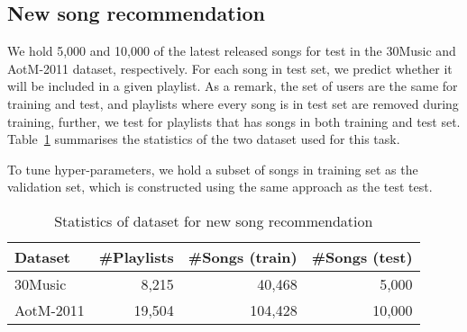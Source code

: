 



\subsection{New song recommendation}
\label{ssec:newsongrec}

We hold 5,000 and 10,000 of the latest released songs for test in the 30Music and AotM-2011 dataset, respectively.
For each song in test set, we predict whether it will be included in a given playlist.
As a remark, the set of users are the same for training and test, 
and playlists where every song is in test set are removed during training,
further, we test for playlists that has songs in both training and test set.
Table~\ref{tab:stats_newsongrec} summarises the statistics of the two dataset used for this task.

To tune hyper-parameters, we hold a subset of songs in training set as the validation set, 
which is constructed using the same approach as the test test.

\begin{table}[!h]
\centering
\caption{Statistics of dataset for new song recommendation}
\label{tab:stats_newsongrec}
\small
\begin{tabular}{lrrr}
\toprule
Dataset   & \#Playlists & \#Songs (train) & \#Songs (test) \\
\midrule
30Music   & 8,215       & 40,468          & 5,000 \\
AotM-2011 & 19,504      & 104,428         & 10,000 \\
\bottomrule
\end{tabular}
\end{table}


